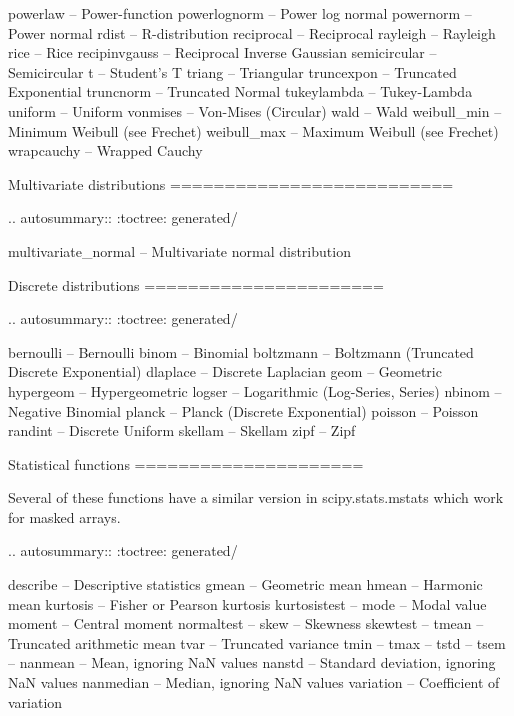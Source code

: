 \begin{DoxyVerb}
   powerlaw          -- Power-function
   powerlognorm      -- Power log normal
   powernorm         -- Power normal
   rdist             -- R-distribution
   reciprocal        -- Reciprocal
   rayleigh          -- Rayleigh
   rice              -- Rice
   recipinvgauss     -- Reciprocal Inverse Gaussian
   semicircular      -- Semicircular
   t                 -- Student's T
   triang            -- Triangular
   truncexpon        -- Truncated Exponential
   truncnorm         -- Truncated Normal
   tukeylambda       -- Tukey-Lambda
   uniform           -- Uniform
   vonmises          -- Von-Mises (Circular)
   wald              -- Wald
   weibull_min       -- Minimum Weibull (see Frechet)
   weibull_max       -- Maximum Weibull (see Frechet)
   wrapcauchy        -- Wrapped Cauchy

Multivariate distributions
==========================

.. autosummary::
   :toctree: generated/

   multivariate_normal   -- Multivariate normal distribution

Discrete distributions
======================

.. autosummary::
   :toctree: generated/

   bernoulli         -- Bernoulli
   binom             -- Binomial
   boltzmann         -- Boltzmann (Truncated Discrete Exponential)
   dlaplace          -- Discrete Laplacian
   geom              -- Geometric
   hypergeom         -- Hypergeometric
   logser            -- Logarithmic (Log-Series, Series)
   nbinom            -- Negative Binomial
   planck            -- Planck (Discrete Exponential)
   poisson           -- Poisson
   randint           -- Discrete Uniform
   skellam           -- Skellam
   zipf              -- Zipf

Statistical functions
=====================

Several of these functions have a similar version in scipy.stats.mstats
which work for masked arrays.

.. autosummary::
   :toctree: generated/

   describe          -- Descriptive statistics
   gmean             -- Geometric mean
   hmean             -- Harmonic mean
   kurtosis          -- Fisher or Pearson kurtosis
   kurtosistest      --
   mode              -- Modal value
   moment            -- Central moment
   normaltest        --
   skew              -- Skewness
   skewtest          --
   tmean             -- Truncated arithmetic mean
   tvar              -- Truncated variance
   tmin              --
   tmax              --
   tstd              --
   tsem              --
   nanmean           -- Mean, ignoring NaN values
   nanstd            -- Standard deviation, ignoring NaN values
   nanmedian         -- Median, ignoring NaN values
   variation         -- Coefficient of variation


\end{DoxyVerb}
